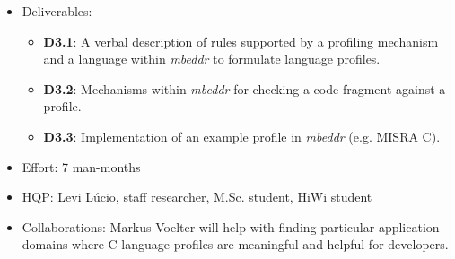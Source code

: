 \begin{itemize}
  \item Deliverables:
  \begin{itemize}
    \item{\textbf{D3.1}:} A verbal description of rules supported by a profiling
    mechanism and a language within \emph{mbeddr} to formulate language profiles.
    \item{\textbf{D3.2}:} Mechanisms within \emph{mbeddr} for checking a code
    fragment against a profile.
    \item{\textbf{D3.3}:} Implementation of an example profile in \emph{mbeddr}
    (e.g. MISRA C).
  \end{itemize} 
  \item Effort: 7 man-months
  \item HQP: Levi L\'ucio, staff researcher, M.Sc. student, HiWi student 
  \item Collaborations: Markus Voelter will help with finding
  particular application domains where C language profiles are meaningful and
  helpful for developers.
\end{itemize}


